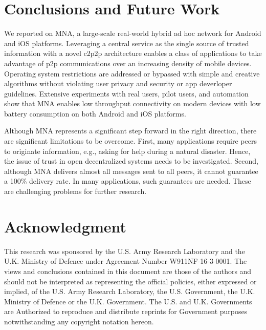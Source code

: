 \documentclass[conference]{IEEEtran}
\begin{document}
\section{Conclusions and Future Work}
\label{sec:conclude}
%
We reported on MNA, a large-scale real-world hybrid ad hoc network for
Android and iOS platforms. Leveraging a central service as the single
source of trusted information with a novel c2p2p architecture enables
a class of applications to take advantage of p2p communications over
an increasing density of mobile devices. Operating system restrictions
are addressed or bypassed with simple and creative algorithms without
violating user privacy and security or app deverloper
guidelines. Extensive experiments with real users, pilot users, and
automation show that MNA enables low throughput connectivity on modern
devices with low battery consumption on both Android and iOS
platforms.

Although MNA represents a significant step forward in the right
direction, there are significant limitations to be overcome. First,
many applications require peers to originate information, e.g., asking
for help during a natural disaster. Hence, the issue of trust in open
decentralized systems needs to be investigated.  Second, although MNA
delivers almost all messages sent to all peers, it cannot guarantee a
100\% delivery rate.  In many applications, such guarantees are
needed. These are challenging problems for further research.

%
\section*{Acknowledgment}
This research was sponsored by the U.S. Army Research Laboratory and
the U.K. Ministry of Defence under Agreement Number
W911NF-16-3-0001. The views and conclusions contained in this document
are those of the authors and should not be interpreted as representing
the official policies, either expressed or implied, of the U.S. Army
Research Laboratory, the U.S. Government, the U.K. Ministry of Defence
or the U.K. Government. The U.S. and U.K. Governments are Authorized
to reproduce and distribute reprints for Government purposes
notwithstanding any copyright notation hereon.
 
\end{document}
